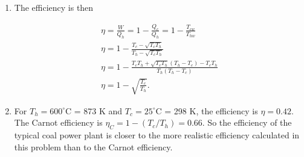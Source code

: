\documentclass{article}
\begin{document}
\begin{enumerate}
\begin{enumerate}
		\item

		The efficiency is then

		\begin{gather*}
		\eta = \frac{W}{Q_h} = 1 - \frac{Q_c}{Q_h} = 1 - \frac{T_{cw}}{T_{hw}} \\
		\eta = 1 - \frac{T_c - \sqrt{T_cT_h}}{T_h - \sqrt{T_cT_h}} \\
		\eta = 1 - \frac{T_cT_h + \sqrt{T_cT_h}(T_h - T_c) - T_cT_h }{T_h(T_h - T_c)} \\
		\eta = 1 - \sqrt{\frac{T_c}{T_h}}.
		\end{gather*}

		\item

		For $T_h = 600^\circ$C = 873 K and $T_c = 25^\circ$C = 298 K, the efficiency is $\eta = 0.42$. The Carnot efficiency is $\eta_C = 1 - (T_c / T_h) = 0.66$. So the efficiency of the typical coal power plant is closer to the more realistic efficiency calculated in this problem than to the Carnot efficiency.

	\end{enumerate}

\end{enumerate}
\end{document}
